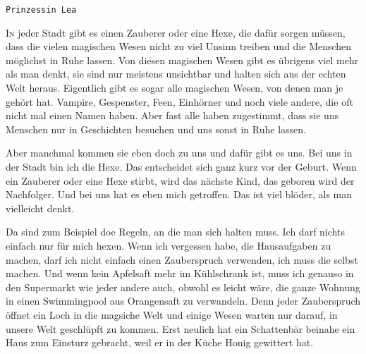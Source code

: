 \thispagestyle{empty}
\begin{center}
\end{center}
\vskip 2cm
{\Huge\color{farbe}\hfill{\tt{Prinzessin Lea}}}
\newpage
\lettrine[lines=2, lhang=.2, loversize=.25, lraise=0.05, findent=0.1em,
nindent=0em]{{\textooquote}I}{n} jeder Stadt gibt es einen Zauberer oder eine Hexe, die dafür sorgen müssen, dass die vielen magischen Wesen nicht zu viel Unsinn treiben und die Menschen möglichst in Ruhe lassen. Von diesen magischen Wesen gibt es übrigens viel mehr als man denkt, sie sind nur meistens unsichtbar und halten sich aus der echten Welt heraus. Eigentlich gibt es sogar alle magischen Wesen, von denen man je gehört hat. Vampire, Gespenster, Feen, Einhörner und noch viele andere, die oft nicht mal einen Namen haben. Aber fast alle haben zugestimmt, dass sie uns Menschen nur in Geschichten besuchen und uns sonst in Ruhe lassen. 

Aber manchmal kommen sie eben doch zu uns und dafür gibt es uns. Bei uns in der Stadt bin ich die Hexe. Das entscheidet sich ganz kurz vor der Geburt. Wenn ein Zauberer oder eine Hexe stirbt, wird das nächste Kind, das geboren wird der Nachfolger. Und bei uns hat es eben mich getroffen. Das ist viel blöder, als man vielleicht denkt.

Da sind zum Beispiel doe Regeln, an die man sich halten muss. Ich darf nichts einfach nur für mich hexen. Wenn ich vergessen habe, die Hausaufgaben zu machen, darf ich nicht einfach einen Zauberspruch verwenden, ich muss die selbst machen. Und wenn kein Apfelsaft mehr im Kühlschrank ist, muss ich genauso in den Supermarkt wie jeder andere auch, obwohl es leicht wäre, die ganze Wohnung in einen Swimmingpool aus Orangensaft zu verwandeln. Denn jeder Zauberspruch öffnet ein Loch in die magsiche Welt und einige Wesen warten nur darauf, in unsere Welt geschlüpft zu kommen. Erst neulich hat ein Schattenbär beinahe ein Haus zum Einsturz gebracht, weil er in der Küche Honig gewittert hat. 


